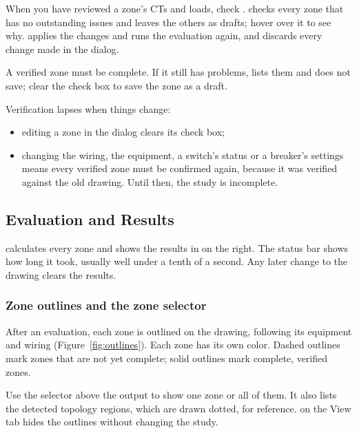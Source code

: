 When you have reviewed a zone's CTs and loads, check .  checks every zone that has
no outstanding issues and leaves the others as drafts; hover over it to see why.
 applies the changes and runs the evaluation again, and  discards
every change made in the dialog.

A verified zone must be complete. If it still has problems,  lists them and
does not save; clear the check box to save the zone as a draft.

Verification lapses when things change:
\begin{itemize}
  \item editing a zone in the dialog clears its check box;
  \item changing the wiring, the equipment, a switch's status or a breaker's settings
        means every verified zone must be confirmed again, because it was verified
        against the old drawing. Until then, the study is incomplete.
\end{itemize}

\subsection{Evaluation and Results}\label{sec:results}

 calculates every zone and shows the results in
 on the right. The status bar shows how long it took, usually
well under a tenth of a second. Any later change to the drawing clears the results.

\subsubsection{Zone outlines and the zone selector}

After an evaluation, each zone is outlined on the drawing, following its equipment and
wiring (Figure~\ref{fig:outlines}). Each zone has its own color. Dashed outlines mark
zones that are not yet complete; solid outlines mark complete, verified zones.

Use the selector above the output to show one zone or all of them. It also lists the
detected topology regions, which are drawn dotted, for reference.  on
the View tab hides the outlines without changing the study.

